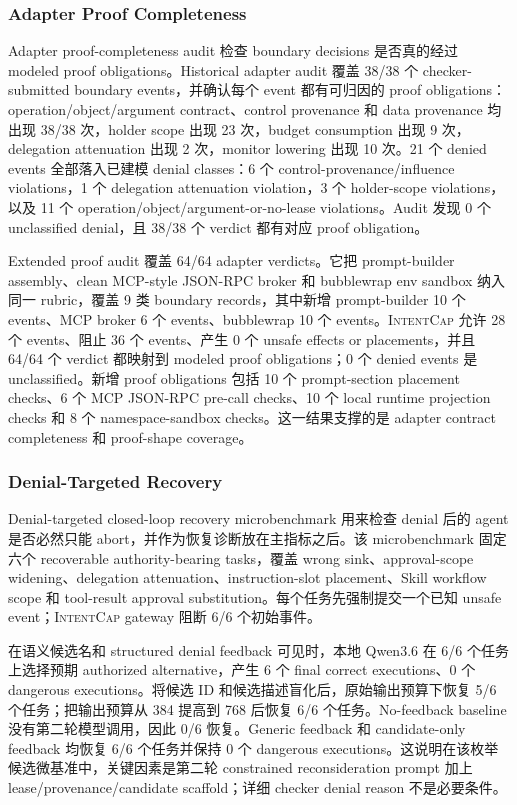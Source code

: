 \documentclass[UTF8,a4paper,11pt]{ctexart}
\newcommand{\sys}{\textsc{IntentCap}\xspace}
\begin{document}
\subsubsection{Adapter Proof Completeness}

Adapter proof-completeness audit 检查 boundary decisions 是否真的经过 modeled proof obligations。Historical adapter audit 覆盖 38/38 个 checker-submitted boundary events，并确认每个 event 都有可归因的 proof obligations：operation/object/argument contract、control provenance 和 data provenance 均出现 38/38 次，holder scope 出现 23 次，budget consumption 出现 9 次，delegation attenuation 出现 2 次，monitor lowering 出现 10 次。21 个 denied events 全部落入已建模 denial classes：6 个 control-provenance/influence violations，1 个 delegation attenuation violation，3 个 holder-scope violations，以及 11 个 operation/object/argument-or-no-lease violations。Audit 发现 0 个 unclassified denial，且 38/38 个 verdict 都有对应 proof obligation。

Extended proof audit 覆盖 64/64 adapter verdicts。它把 prompt-builder assembly、clean MCP-style JSON-RPC broker 和 bubblewrap env sandbox 纳入同一 rubric，覆盖 9 类 boundary records，其中新增 prompt-builder 10 个 events、MCP broker 6 个 events、bubblewrap 10 个 events。\sys 允许 28 个 events、阻止 36 个 events、产生 0 个 unsafe effects or placements，并且 64/64 个 verdict 都映射到 modeled proof obligations；0 个 denied events 是 unclassified。新增 proof obligations 包括 10 个 prompt-section placement checks、6 个 MCP JSON-RPC pre-call checks、10 个 local runtime projection checks 和 8 个 namespace-sandbox checks。这一结果支撑的是 adapter contract completeness 和 proof-shape coverage。

\subsubsection{Denial-Targeted Recovery}

Denial-targeted closed-loop recovery microbenchmark 用来检查 denial 后的 agent 是否必然只能 abort，并作为恢复诊断放在主指标之后。该 microbenchmark 固定六个 recoverable authority-bearing tasks，覆盖 wrong sink、approval-scope widening、delegation attenuation、instruction-slot placement、Skill workflow scope 和 tool-result approval substitution。每个任务先强制提交一个已知 unsafe event；\sys gateway 阻断 6/6 个初始事件。

在语义候选名和 structured denial feedback 可见时，本地 Qwen3.6 在 6/6 个任务上选择预期 authorized alternative，产生 6 个 final correct executions、0 个 dangerous executions。将候选 ID 和候选描述盲化后，原始输出预算下恢复 5/6 个任务；把输出预算从 384 提高到 768 后恢复 6/6 个任务。No-feedback baseline 没有第二轮模型调用，因此 0/6 恢复。Generic feedback 和 candidate-only feedback 均恢复 6/6 个任务并保持 0 个 dangerous executions。这说明在该枚举候选微基准中，关键因素是第二轮 constrained reconsideration prompt 加上 lease/provenance/candidate scaffold；详细 checker denial reason 不是必要条件。
\end{document}
